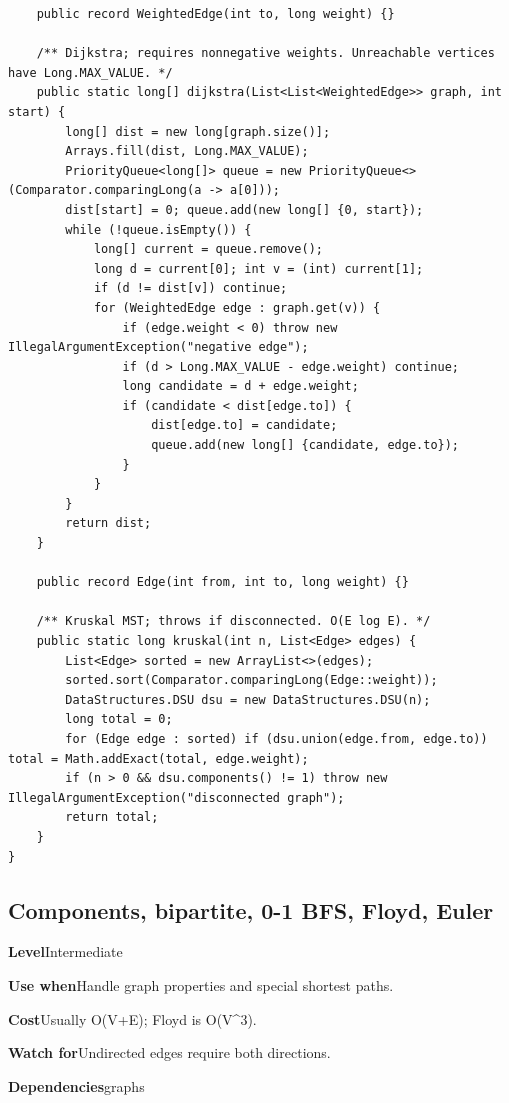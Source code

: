 \documentclass[10pt,letterpaper]{article}
\newcommand{\entrylabel}[1]{\textcolor{accent}{\bfseries #1}}
\begin{document}
\begin{lstlisting}
    public record WeightedEdge(int to, long weight) {}

    /** Dijkstra; requires nonnegative weights. Unreachable vertices have Long.MAX_VALUE. */
    public static long[] dijkstra(List<List<WeightedEdge>> graph, int start) {
        long[] dist = new long[graph.size()];
        Arrays.fill(dist, Long.MAX_VALUE);
        PriorityQueue<long[]> queue = new PriorityQueue<>(Comparator.comparingLong(a -> a[0]));
        dist[start] = 0; queue.add(new long[] {0, start});
        while (!queue.isEmpty()) {
            long[] current = queue.remove();
            long d = current[0]; int v = (int) current[1];
            if (d != dist[v]) continue;
            for (WeightedEdge edge : graph.get(v)) {
                if (edge.weight < 0) throw new IllegalArgumentException("negative edge");
                if (d > Long.MAX_VALUE - edge.weight) continue;
                long candidate = d + edge.weight;
                if (candidate < dist[edge.to]) {
                    dist[edge.to] = candidate;
                    queue.add(new long[] {candidate, edge.to});
                }
            }
        }
        return dist;
    }

    public record Edge(int from, int to, long weight) {}

    /** Kruskal MST; throws if disconnected. O(E log E). */
    public static long kruskal(int n, List<Edge> edges) {
        List<Edge> sorted = new ArrayList<>(edges);
        sorted.sort(Comparator.comparingLong(Edge::weight));
        DataStructures.DSU dsu = new DataStructures.DSU(n);
        long total = 0;
        for (Edge edge : sorted) if (dsu.union(edge.from, edge.to)) total = Math.addExact(total, edge.weight);
        if (n > 0 && dsu.components() != 1) throw new IllegalArgumentException("disconnected graph");
        return total;
    }
}
\end{lstlisting}
\subsection{Components, bipartite, 0-1 BFS, Floyd, Euler}
\begin{guidebox}\small
\entrylabel{Level}\quad Intermediate\par
\entrylabel{Use when}\quad Handle graph properties and special shortest paths.\par
\entrylabel{Cost}\quad Usually O(V+E); Floyd is O(V\textasciicircum{}3).\par
\entrylabel{Watch for}\quad Undirected edges require both directions.\par
\entrylabel{Dependencies}\quad graphs\par
\end{guidebox}
\end{document}
